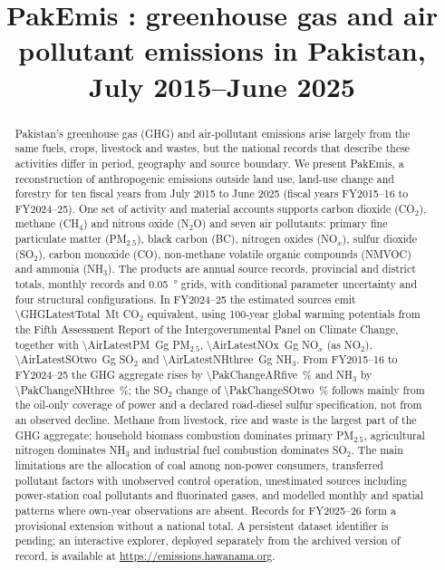 \documentclass[essd,manuscript]{copernicus}
\begin{document}
\title{PakEmis \PakEmisRelease: greenhouse gas and air pollutant emissions in Pakistan, July 2015--June 2025}
\received{}\pubdiscuss{}\revised{}\accepted{}\published{}
\maketitle

\begin{abstract}
Pakistan's greenhouse gas (GHG) and air-pollutant emissions arise largely from the same fuels, crops, livestock and wastes, but the national records that describe these activities differ in period, geography and source boundary. We present PakEmis, a reconstruction of anthropogenic emissions outside land use, land-use change and forestry for ten fiscal years from July 2015 to June 2025 (fiscal years FY2015--16 to FY2024--25). One set of activity and material accounts supports carbon dioxide (CO$_2$), methane (CH$_4$) and nitrous oxide (N$_2$O) and seven air pollutants: primary fine particulate matter (PM$_{2.5}$), black carbon (BC), nitrogen oxides (NO$_x$), sulfur dioxide (SO$_2$), carbon monoxide (CO), non-methane volatile organic compounds (NMVOC) and ammonia (NH$_3$). The products are annual source records, provincial and district totals, monthly records and \SI{0.05}{\degree} grids, with conditional parameter uncertainty and four structural configurations. In FY2024--25 the estimated sources emit \SI{\GHGLatestTotal}{\mega\tonne} CO$_2$ equivalent, using 100-year global warming potentials from the Fifth Assessment Report of the Intergovernmental Panel on Climate Change, together with \SI{\AirLatestPM}{\giga\gram} PM$_{2.5}$, \SI{\AirLatestNOx}{\giga\gram} NO$_x$ (as NO$_2$), \SI{\AirLatestSOtwo}{\giga\gram} SO$_2$ and \SI{\AirLatestNHthree}{\giga\gram} NH$_3$. From FY2015--16 to FY2024--25 the GHG aggregate rises by \SI{\PakChangeARfive}{\percent} and NH$_3$ by \SI{\PakChangeNHthree}{\percent}; the SO$_2$ change of \SI{\PakChangeSOtwo}{\percent} follows mainly from the oil-only coverage of power and a declared road-diesel sulfur specification, not from an observed decline. Methane from livestock, rice and waste is the largest part of the GHG aggregate; household biomass combustion dominates primary PM$_{2.5}$, agricultural nitrogen dominates NH$_3$ and industrial fuel combustion dominates SO$_2$. The main limitations are the allocation of coal among non-power consumers, transferred pollutant factors with unobserved control operation, unestimated sources including power-station coal pollutants and fluorinated gases, and modelled monthly and spatial patterns where own-year observations are absent. Records for FY2025--26 form a provisional extension without a national total. A persistent dataset identifier is pending; an interactive explorer, deployed separately from the archived version of record, is available at \url{https://emissions.hawanama.org}.
\end{abstract}
\end{document}
